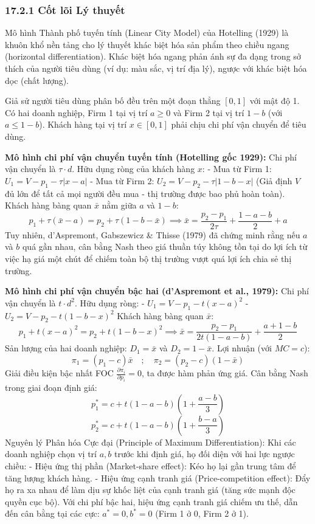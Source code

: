\documentclass[
]{article}
\begin{document}
\subsubsection{17.2.1 Cốt lõi Lý
thuyết}\label{cux1ed1t-luxf5i-luxfd-thuyux1ebft-1}

Mô hình Thành phố tuyến tính (Linear City Model) của Hotelling (1929) là
khuôn khổ nền tảng cho lý thuyết khác biệt hóa sản phẩm theo chiều ngang
(horizontal differentiation). Khác biệt hóa ngang phản ánh sự đa dạng
trong sở thích của người tiêu dùng (ví dụ: màu sắc, vị trí địa lý),
ngược với khác biệt hóa dọc (chất lượng).

Giả sử người tiêu dùng phân bố đều trên một đoạn thẳng \([0, 1]\) với
mật độ 1. Có hai doanh nghiệp, Firm 1 tại vị trí \(a \ge 0\) và Firm 2
tại vị trí \(1 - b\) (với \(a \le 1 - b\)). Khách hàng tại vị trí
\(x \in [0, 1]\) phải chịu chi phí vận chuyển để tiêu dùng.

\textbf{Mô hình chi phí vận chuyển tuyến tính (Hotelling gốc 1929):} Chi
phí vận chuyển là \(\tau \cdot d\). Hữu dụng ròng của khách hàng \(x\):
- Mua từ Firm 1: \(U_1 = V - p_1 - \tau |x - a|\) - Mua từ Firm 2:
\(U_2 = V - p_2 - \tau |1 - b - x|\) (Giả định \(V\) đủ lớn để tất cả
mọi người đều mua - thị trường được bao phủ hoàn toàn). Khách hàng bàng
quan \(\bar{x}\) nằm giữa \(a\) và \(1-b\):
\[ p_1 + \tau (\bar{x} - a) = p_2 + \tau (1 - b - \bar{x}) \implies \bar{x} = \frac{p_2 - p_1}{2\tau} + \frac{1 - a - b}{2} + a \]
Tuy nhiên, d'Aspremont, Gabszewicz \& Thisse (1979) đã chứng minh rằng
nếu \(a\) và \(b\) quá gần nhau, cân bằng Nash theo giá thuần túy không
tồn tại do lợi ích từ việc hạ giá một chút để chiếm toàn bộ thị trường
vượt quá lợi ích chia sẻ thị trường.

\textbf{Mô hình chi phí vận chuyển bậc hai (d'Aspremont et al., 1979):}
Chi phí vận chuyển là \(t \cdot d^2\). Hữu dụng ròng: -
\(U_1 = V - p_1 - t(x - a)^2\) - \(U_2 = V - p_2 - t(1 - b - x)^2\)
Khách hàng bàng quan \(\bar{x}\):
\[ p_1 + t(x - a)^2 = p_2 + t(1 - b - x)^2 \implies \bar{x} = \frac{p_2 - p_1}{2t(1 - a - b)} + \frac{a + 1 - b}{2} \]
Sản lượng của hai doanh nghiệp: \(D_1 = \bar{x}\) và
\(D_2 = 1 - \bar{x}\). Lợi nhuận (với \(MC=c\)):
\[ \pi_1 = (p_1 - c)\bar{x} \quad ; \quad \pi_2 = (p_2 - c)(1 - \bar{x}) \]
Giải điều kiện bậc nhất FOC \(\frac{\partial \pi_i}{\partial p_i} = 0\),
ta được hàm phản ứng giá. Cân bằng Nash trong giai đoạn định giá:
\[ p_1^* = c + t(1 - a - b)\left(1 + \frac{a - b}{3}\right) \]
\[ p_2^* = c + t(1 - a - b)\left(1 + \frac{b - a}{3}\right) \] Nguyên lý
Phân hóa Cực đại (Principle of Maximum Differentiation): Khi các doanh
nghiệp chọn vị trí \(a, b\) trước khi định giá, họ đối diện với hai lực
ngược chiều: - Hiệu ứng thị phần (Market-share effect): Kéo họ lại gần
trung tâm để tăng lượng khách hàng. - Hiệu ứng cạnh tranh giá
(Price-competition effect): Đẩy họ ra xa nhau để làm dịu sự khốc liệt
của cạnh tranh giá (tăng sức mạnh độc quyền cục bộ). Với chi phí bậc
hai, hiệu ứng cạnh tranh giá chiếm ưu thế, dẫn đến cân bằng tại các cực:
\(a^* = 0, b^* = 0\) (Firm 1 ở 0, Firm 2 ở 1).
\end{document}
